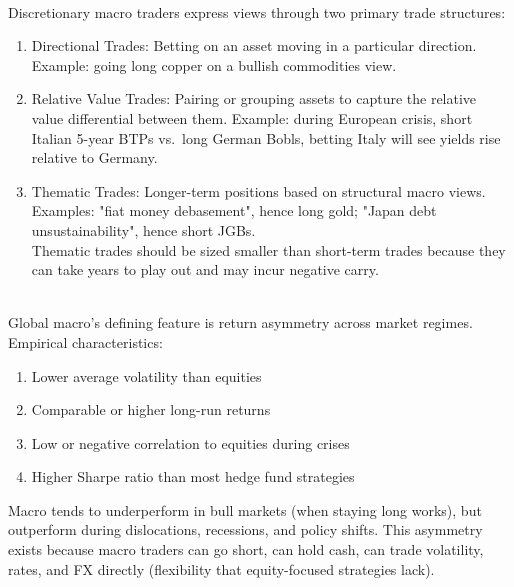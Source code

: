 \documentclass[a4paper,oneside,openany]{book}
\begin{document}
\begin{remark} \\
Discretionary macro traders express views through two primary trade structures:
\begin{enumerate}[label=\roman*.]
\setlength{\itemsep}{0pt}
\item Directional Trades: Betting on an asset moving in a particular direction. Example: going long copper on a bullish commodities view.
\item Relative Value Trades: Pairing or grouping assets to capture the relative value differential between them. Example: during European crisis, short Italian 5-year BTPs vs.\ long German Bobls, betting Italy will see yields rise relative to Germany.
\item Thematic Trades: Longer-term positions based on structural macro views.\\
Examples: "fiat money debasement", hence long gold; "Japan debt unsustainability", hence short JGBs.\\
Thematic trades should be sized smaller than short-term trades because they can take years to play out and may incur negative carry.
\end{enumerate}
\end{remark}

\begin{remark} \\
Global macro's defining feature is return asymmetry across market regimes. Empirical characteristics:
\begin{enumerate}[label=\roman*.]
\setlength{\itemsep}{0pt}
\item Lower average volatility than equities
\item Comparable or higher long-run returns
\item Low or negative correlation to equities during crises
\item Higher Sharpe ratio than most hedge fund strategies
\end{enumerate}
Macro tends to underperform in bull markets (when staying long works), but outperform during dislocations, recessions, and policy shifts. This asymmetry exists because macro traders can go short, can hold cash, can trade volatility, rates, and FX directly (flexibility that equity-focused strategies lack).
\end{remark}
\end{document}
